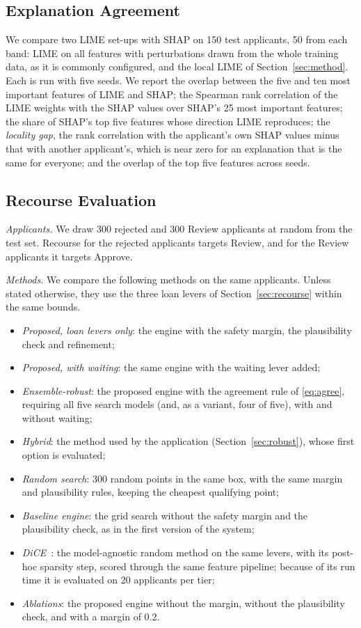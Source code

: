 \subsection{Explanation Agreement}
We compare two LIME set-ups with SHAP on 150 test applicants, 50 from each band: LIME on all features with
perturbations drawn from the whole training data, as it is commonly configured, and the local
LIME of Section~\ref{sec:method}. Each is run with five seeds. We report the overlap between the five and ten
most important features of LIME and SHAP; the Spearman rank correlation of the LIME weights with the SHAP values over
SHAP's 25 most important features; the share of SHAP's top five features whose direction LIME reproduces; the
\emph{locality gap}, the rank correlation with the applicant's own SHAP values minus that with another applicant's, which
is near zero for an explanation that is the same for everyone; and the overlap of the top five features across seeds.

\subsection{Recourse Evaluation}
\emph{Applicants.} We draw 300 rejected and 300 Review applicants at random from the test set. Recourse for the
rejected applicants targets Review, and for the Review applicants it targets Approve.

\emph{Methods.} We compare the following methods on the same applicants. Unless stated otherwise, they use the three
loan levers of Section~\ref{sec:recourse} within the same bounds.
\begin{itemize}
\item \emph{Proposed, loan levers only}: the engine with the safety margin, the plausibility check and refinement;
\item \emph{Proposed, with waiting}: the same engine with the waiting lever added;
\item \emph{Ensemble-robust}: the proposed engine with the agreement rule of \eqref{eq:agree}, requiring all five
search models (and, as a variant, four of five), with and without waiting;
\item \emph{Hybrid}: the method used by the application (Section~\ref{sec:robust}), whose first option is evaluated;
\item \emph{Random search}: 300 random points in the same box, with the same margin and plausibility rules, keeping
the cheapest qualifying point;
\item \emph{Baseline engine}: the grid search without the safety margin and the plausibility check, as in the first
version of the system;
\item \emph{DiCE}~\cite{mothilal2020dice}: the model-agnostic random method on the same levers, with its post-hoc
sparsity step, scored through the same feature pipeline; because of its run time it is evaluated on 20 applicants per
tier;
\item \emph{Ablations}: the proposed engine without the margin, without the plausibility check, and with a margin of
0.2.
\end{itemize}

